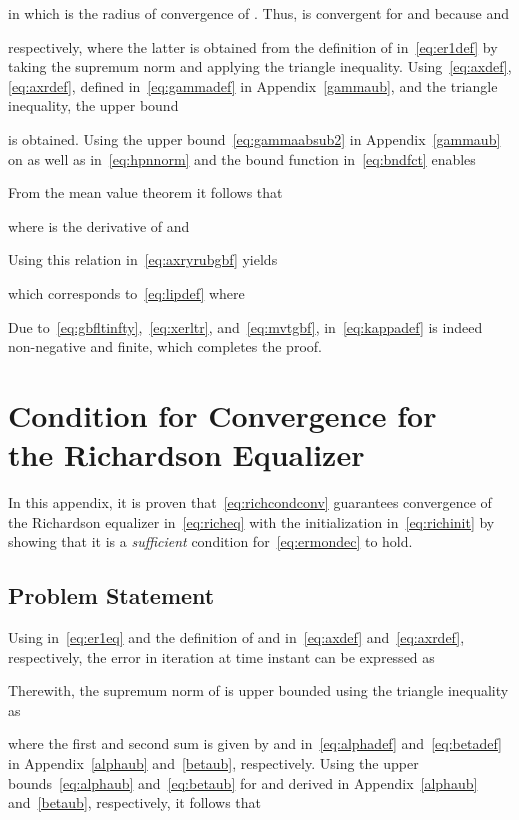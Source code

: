 \documentclass[10pt,twocolumn,twoside]{IEEEtran}
\begin{document}
in which  is the radius of convergence of . Thus,  is convergent
for  and  because  and

respectively, where the latter is obtained from the definition of 
in~\eqref{eq:er1def} by taking the supremum norm
and applying the triangle inequality. Using~\eqref{eq:axdef}, \eqref{eq:axrdef},
 defined in~\eqref{eq:gammadef} in Appendix~\ref{gammaub},
and the triangle inequality, the upper bound

is obtained. Using the upper bound~\eqref{eq:gammaabsub2} in Appendix~\ref{gammaub} on
 as well as 
in~\eqref{eq:hpnnorm} and the bound function  in~\eqref{eq:bndfct} enables

From the mean value theorem it follows that~\cite{rudin1964,boyd1984}

where  is the derivative of  and

Using this relation in~\eqref{eq:axryrubgbf} yields

which corresponds to~\eqref{eq:lipdef} where

Due to~\eqref{eq:gbfltinfty},~\eqref{eq:xerltr}, and~\eqref{eq:mvtgbf},  in~\eqref{eq:kappadef}
is indeed non-negative and finite, which completes the proof.


\section{Condition for Convergence for\\ the Richardson Equalizer}
	\label{ccderi1}

In this appendix, it is proven that~\eqref{eq:richcondconv}
guarantees convergence of the Richardson equalizer in~\eqref{eq:richeq}
with the initialization in~\eqref{eq:richinit} by showing that
it is a \emph{sufficient} condition for~\eqref{eq:ermondec} to hold.

\subsection{Problem Statement}

Using  in~\eqref{eq:er1eq} and the definition of
 and  in~\eqref{eq:axdef}
and~\eqref{eq:axrdef}, respectively, the error
 in iteration  at time instant  can be expressed as

Therewith, the supremum norm of  is upper bounded using
the triangle inequality as

where the first and second sum is given by
 and 
in~\eqref{eq:alphadef} and~\eqref{eq:betadef} in
Appendix~\ref{alphaub} and~\ref{betaub}, respectively. Using the upper bounds~\eqref{eq:alphaub}
and~\eqref{eq:betaub} for  and 
derived in Appendix~\ref{alphaub} and~\ref{betaub}, respectively, it follows that
\end{document}
